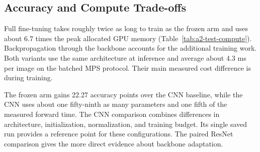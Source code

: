 \subsection{Accuracy and Compute Trade-offs}

Full fine-tuning takes roughly twice as long to train as the frozen arm and uses about 6.7 times the peak allocated GPU memory (Table~\ref{tab:a2-test-compute}). Backpropagation through the backbone accounts for the additional training work. Both variants use the same architecture at inference and average about 4.3 ms per image on the batched MPS protocol. Their main measured cost difference is during training.

The frozen arm gains 22.27 accuracy points over the CNN baseline, while the CNN uses about one fifty-ninth as many parameters and one fifth of the measured forward time. The CNN comparison combines differences in architecture, initialization, normalization, and training budget. Its single saved run provides a reference point for these configurations. The paired ResNet comparison gives the more direct evidence about backbone adaptation.
